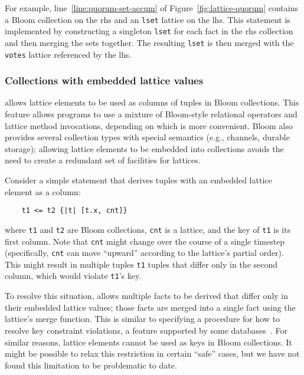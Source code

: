 For example, line~\ref{line:quorum-set-accum} of Figure~\ref{fig:lattice-quorum}
contains a Bloom collection on the rhs and an \texttt{lset} lattice on the
lhs. This statement is implemented by constructing a singleton \texttt{lset} for
each fact in the rhs collection and then merging the sets together. The
resulting \texttt{lset} is then merged with the \texttt{votes} lattice
referenced by the lhs.

\subsubsection{Collections with embedded lattice values}
\label{sec:lattice-embedding}
\lang allows lattice elements to be used as columns of tuples in Bloom
collections. This feature allows \lang programs to use a mixture of Bloom-style
relational operators and lattice method invocations, depending on which is more
convenient. Bloom also provides several collection types with special semantics
(e.g., channels, durable storage); allowing lattice elements to be embedded into
collections avoids the need to create a redundant set of facilities for
lattices.

Consider a simple \lang statement that derives tuples with an embedded lattice
element as a column:
\begin{verbatim}
    t1 <= t2 {|t| [t.x, cnt]}
\end{verbatim}
where \texttt{t1} and \texttt{t2} are Bloom collections, \texttt{cnt} is a
lattice, and the key of \texttt{t1} is its first column. Note that
\texttt{cnt} might change over the course of a single timestep (specifically,
\texttt{cnt} can move ``upward'' according to the lattice's partial
order). This might result in multiple tuples \texttt{t1} tuples that differ only
in the second column, which would violate \texttt{t1}'s key.

To resolve this situation, \lang allows multiple facts to be derived that differ
only in their embedded lattice values; those facts are merged into a single fact
using the lattice's merge function. This is similar to specifying a procedure
for how to resolve key constraint violations, a feature supported by some
databases~\cite{oracle-conflict,sqlite-on-conflict}. For similar reasons,
lattice elements cannot be used as keys in Bloom collections. It might be
possible to relax this restriction in certain ``safe'' cases, but we have not
found this limitation to be problematic to date.

